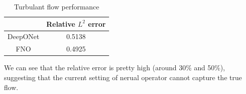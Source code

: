 \documentclass{article}
\begin{document}
\begin {table}[H]
 \caption{Turbulant flow performance}
  \label{fig:table7}
\begin{center}
 \begin{tabular}{|c|c|} 
 \hline
& Relative $L^2$ error  \\ [0.5ex] 
 \hline\hline
DeepONet & 0.5138   \\ 
 \hline
FNO & 0.4925    \\ 
 \hline

\end{tabular}
\end{center}
\end {table}

We can see that the relative error is pretty high (around 30\% and 50\%), suggesting that the current setting of nerual operator cannot capture the true flow.

\newpage




\end{document}
